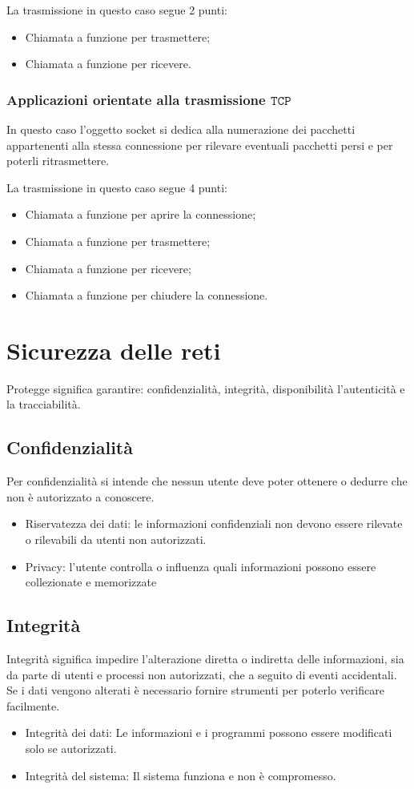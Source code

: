 \documentclass[oneside,a4paper,11pt]{book}
\theoremstyle{italicstyle}
\theoremstyle{normStyle}
\begin{document}
La trasmissione in questo caso segue 2 punti:
\begin{itemize}
  \item Chiamata a funzione per trasmettere;
  \item Chiamata a funzione per ricevere.
\end{itemize}
\subsection{Applicazioni orientate alla trasmissione $\texttt{TCP}$}
In questo caso l'oggetto socket si dedica alla numerazione dei pacchetti 
appartenenti alla stessa connessione per rilevare eventuali pacchetti persi 
e per poterli ritrasmettere.

La trasmissione in questo caso segue 4 punti:
\begin{itemize}
  \item Chiamata a funzione per aprire la connessione;
  \item Chiamata a funzione per trasmettere;
  \item Chiamata a funzione per ricevere;
  \item Chiamata a funzione per chiudere la connessione. 
\end{itemize}
\chapter{Sicurezza delle reti}
Protegge significa garantire: confidenzialità, integrità, disponibilità
l'autenticità e la tracciabilità.
\section{Confidenzialità}
Per confidenzialità si intende che nessun utente deve poter ottenere o 
dedurre che non è autorizzato a conoscere.
\begin{itemize}
  \item Riservatezza dei dati: le informazioni confidenziali non devono
  essere rilevate o rilevabili da utenti non autorizzati.
  \item Privacy: l'utente controlla  o influenza quali informazioni possono 
  essere collezionate e memorizzate 
\end{itemize}
\section{Integrità}
Integrità significa impedire l’alterazione diretta o indiretta delle informazioni, 
sia da parte di utenti e processi non autorizzati, che a seguito di eventi accidentali.
Se i dati vengono alterati è necessario fornire strumenti per poterlo verificare facilmente.
\begin{itemize}
  \item Integrità dei dati: Le informazioni e i programmi possono essere modificati solo se autorizzati.
  \item Integrità del sistema: Il sistema funziona e non è compromesso.
\end{itemize}
\end{document}
